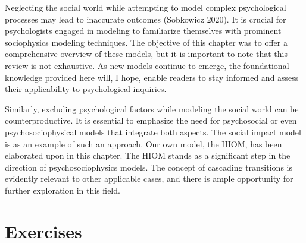 \documentclass[
  a4paper,
  DIV=11,
  numbers=noendperiod,
  oneside]{scrreprt}
\begin{document}
Neglecting the social world while attempting to model complex
psychological processes may lead to inaccurate outcomes (Sobkowicz
2020). It is crucial for psychologists engaged in modeling to
familiarize themselves with prominent sociophysics modeling techniques.
The objective of this chapter was to offer a comprehensive overview of
these models, but it is important to note that this review is not
exhaustive. As new models continue to emerge, the foundational knowledge
provided here will, I hope, enable readers to stay informed and assess
their applicability to psychological inquiries.

Similarly, excluding psychological factors while modeling the social
world can be counterproductive. It is essential to emphasize the need
for psychosocial or even psychosociophysical models that integrate both
aspects. The social impact model is as an example of such an approach.
Our own model, the HIOM, has been elaborated upon in this chapter. The
HIOM stands as a significant step in the direction of psychosociophysics
models. The concept of cascading transitions is evidently relevant to
other applicable cases, and there is ample opportunity for further
exploration in this field.

\section{Exercises}\label{sec-Exercises-ch7}
\end{document}
